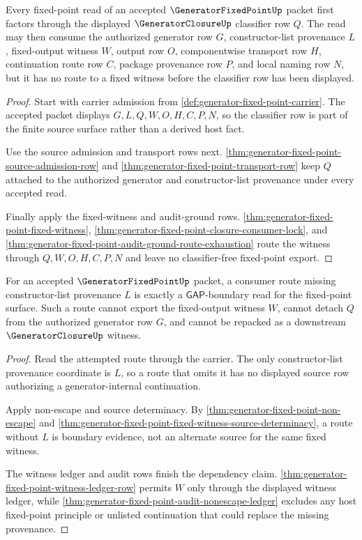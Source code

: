 \begin{theorem}
\label{thm:generator-fixed-point-generatorclosure-handoff}
Every fixed-point read of an accepted $\GeneratorFixedPointUp$ packet first factors through the displayed $\GeneratorClosureUp$ classifier row $Q$. The read may then consume the authorized generator row $G$, constructor-list provenance $L$, fixed-output witness $W$, output row $O$, componentwise transport row $H$, continuation route row $C$, package provenance row $P$, and local naming row $N$, but it has no route to a fixed witness before the classifier row has been displayed.
\end{theorem}
\begin{proof}
Start with carrier admission from \autoref{def:generator-fixed-point-carrier}. The accepted packet displays $G,L,Q,W,O,H,C,P,N$, so the classifier row is part of the finite source surface rather than a derived host fact.

Use the source admission and transport rows next. \autoref{thm:generator-fixed-point-source-admission-row} and \autoref{thm:generator-fixed-point-transport-row} keep $Q$ attached to the authorized generator and constructor-list provenance under every accepted read.

Finally apply the fixed-witness and audit-ground rows. \autoref{thm:generator-fixed-point-fixed-witness}, \autoref{thm:generator-fixed-point-closure-consumer-lock}, and \autoref{thm:generator-fixed-point-audit-ground-route-exhaustion} route the witness through $Q,W,O,H,C,P,N$ and leave no classifier-free fixed-point export.
\end{proof}

\begin{theorem}
\label{thm:generator-fixed-point-boundary-gap-dependency}
For an accepted $\GeneratorFixedPointUp$ packet, a consumer route missing constructor-list provenance $L$ is exactly a $\mathsf{GAP}$-boundary read for the fixed-point surface. Such a route cannot export the fixed-output witness $W$, cannot detach $Q$ from the authorized generator row $G$, and cannot be repacked as a downstream $\GeneratorClosureUp$ witness.
\end{theorem}
\begin{proof}
Read the attempted route through the carrier. The only constructor-list provenance coordinate is $L$, so a route that omits it has no displayed source row authorizing a generator-internal continuation.

Apply non-escape and source determinacy. By \autoref{thm:generator-fixed-point-non-escape} and \autoref{thm:generator-fixed-point-fixed-witness-source-determinacy}, a route without $L$ is boundary evidence, not an alternate source for the same fixed witness.

The witness ledger and audit rows finish the dependency claim. \autoref{thm:generator-fixed-point-witness-ledger-row} permits $W$ only through the displayed witness ledger, while \autoref{thm:generator-fixed-point-audit-nonescape-ledger} excludes any host fixed-point principle or unlisted continuation that could replace the missing provenance.
\end{proof}

